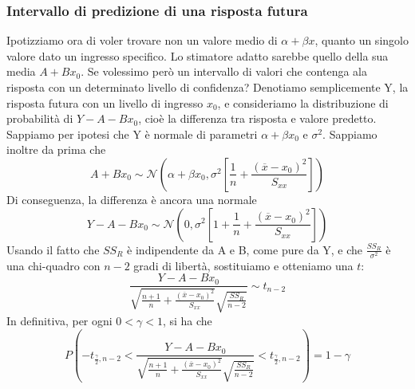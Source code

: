 \documentclass[11pt]{article}
\begin{document}
\subsubsection{Intervallo di predizione di una risposta futura}
Ipotizziamo ora di voler trovare non un valore medio di $\alpha+\beta x$, quanto un singolo valore dato un ingresso specifico. Lo stimatore adatto sarebbe quello della sua media $A+Bx_0$. Se volessimo però un intervallo di valori che contenga ala risposta con un determinato livello di confidenza?
Denotiamo semplicemente Y, la risposta futura con un livello di ingresso $x_0$, e consideriamo la distribuzione di probabilità di $Y-A-Bx_0$, cioè la differenza tra risposta e valore predetto. Sappiamo per ipotesi che Y è normale di parametri $\alpha+\beta x_0$ e $\sigma^2$. Sappiamo inoltre da prima che 
\begin{displaymath}
    A+Bx_0 \sim \mathcal{N}\left(\alpha+\beta x_0, \sigma^2\left[\frac{1}{n}+\frac{(\overline{x}-x_0)^2}{S_{xx}}\right]\right)
\end{displaymath}
Di conseguenza, la differenza è ancora una normale
\begin{displaymath}
    Y-A-Bx_0 \sim \mathcal{N}\left(0, \sigma^2\left[1+\frac{1}{n}+\frac{(\overline{x}-x_0)^2}{S_{xx}}\right]\right)
\end{displaymath}
Usando il fatto che $SS_R$ è indipendente da A e B, come pure da Y, e che $\frac{SS_R}{\sigma^2}$ è una chi-quadro con $n-2$ gradi di libertà, sostituiamo e otteniamo una $t$:
\begin{displaymath}
    \frac{Y-A-Bx_0}{\sqrt{\frac{n+1}{n}+\frac{(\overline{x}-x_0)^2}{S_{xx}}}\sqrt{\frac{SS_R}{n-2}}}\sim t_{n-2}
\end{displaymath} 
In definitiva, per ogni $0<\gamma<1$, si ha che
\begin{displaymath}
    P\left(-t_{\frac{\gamma}{2},n-2}  <      \frac{Y-A-Bx_0}{\sqrt{\frac{n+1}{n}+\frac{(\overline{x}-x_0)^2}{S_{xx}}}\sqrt{\frac{SS_R}{n-2}}}  <  t_{\frac{\gamma}{2},n-2}\right) = 1-\gamma
\end{displaymath}
\end{document}
